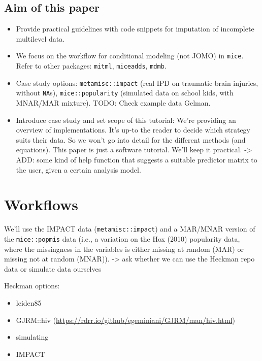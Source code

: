 \documentclass[
]{jss}
\begin{document}
\hypertarget{aim-of-this-paper}{%
\subsection{Aim of this paper}\label{aim-of-this-paper}}

\begin{itemize}
\item
  Provide practical guidelines with code snippets for imputation of
  incomplete multilevel data.
\item
  We focus on the workflow for conditional modeling (not JOMO) in
  \texttt{mice}. Refer to other packages: \texttt{mitml},
  \texttt{miceadds}, \texttt{mdmb}.
\item
  Case study options: \texttt{metamisc::impact} (real IPD on traumatic
  brain injuries, without \texttt{NA}s), \texttt{mice::popularity}
  (simulated data on school kids, with MNAR/MAR mixture). TODO: Check
  example data Gelman.
\item
  Introduce case study and set scope of this tutorial: We're providing
  an overview of implementations. It's up-to the reader to decide which
  strategy suits their data. So we won't go into detail for the
  different methods (and equations). This paper is just a software
  tutorial. We'll keep it practical. -\textgreater{} ADD: some kind of
  help function that suggests a suitable predictor matrix to the user,
  given a certain analysis model.
\end{itemize}

\hypertarget{workflows}{%
\section{Workflows}\label{workflows}}

We'll use the IMPACT data (\texttt{metamisc::impact}) and a MAR/MNAR
version of the \texttt{mice::popmis} data (i.e., a variation on the Hox
(2010) popularity data, where the missingness in the variables is either
missing at random (MAR) or missing not at random (MNAR)).
-\textgreater{} ask whether we can use the Heckman repo data or simulate
data ourselves

Heckman options:

\begin{itemize}
\item
  leiden85
\item
  GJRM::hiv (\url{https://rdrr.io/github/egeminiani/GJRM/man/hiv.html})
\item
  simulating
\item
  IMPACT
\end{itemize}
\end{document}
